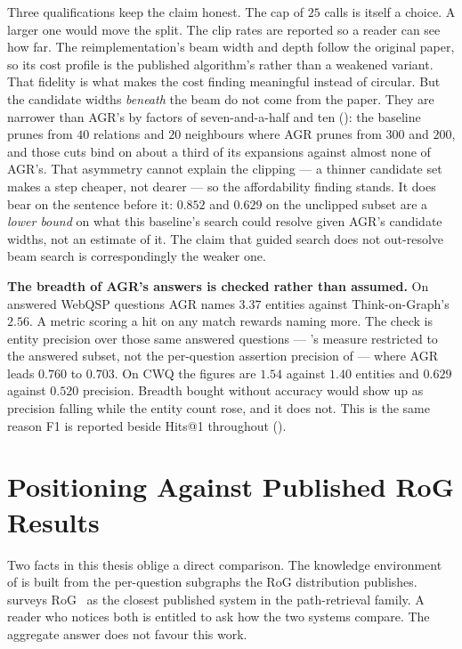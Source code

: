 Three qualifications keep the claim honest. The cap of $25$ calls is itself a
choice. A larger one would move the split. The clip rates are reported so a
reader can see how far. The reimplementation's beam width and depth follow the
original paper, so its cost profile is the published algorithm's rather than a
weakened variant. That fidelity is what makes the cost finding meaningful
instead of circular. But the candidate widths \emph{beneath} the beam do not
come from the paper. They are narrower than AGR's by factors of
seven-and-a-half and ten (): the baseline prunes from
$40$ relations and $20$ neighbours where AGR prunes from $300$ and $200$, and
those cuts bind on about a third of its expansions against almost none of
AGR's. That asymmetry cannot explain the clipping --- a thinner candidate set
makes a step cheaper, not dearer --- so the affordability finding stands. It
does bear on the sentence before it: $0.852$ and $0.629$ on the unclipped
subset are a \emph{lower bound} on what this baseline's search could resolve
given AGR's candidate widths, not an estimate of it. The claim that guided
search does not out-resolve beam search is correspondingly the weaker one.

\textbf{The breadth of AGR's answers is checked rather than assumed.} On
answered WebQSP questions AGR names $3.37$ entities against Think-on-Graph's
$2.56$. A metric scoring a hit on any match rewards naming more. The check
is entity precision over those same answered questions --- 's
measure restricted to the answered subset, not the per-question assertion
precision of  --- where AGR leads $0.760$ to $0.703$. On
CWQ the figures are $1.54$ against $1.40$ entities and $0.629$ against $0.520$
precision. Breadth bought without accuracy would show up as precision falling
while the entity count rose, and it does not. This is the same reason F1 is
reported beside Hits@1 throughout ().

\section{Positioning Against Published RoG
Results}\label{sec:rog-comparison}

Two facts in this thesis oblige a direct comparison. The knowledge
environment of  is built from the per-question
subgraphs the RoG distribution publishes. 
surveys RoG~\cite{luo2024reasoning} as the closest published system in the
path-retrieval family. A reader who notices both is entitled to ask how the
two systems compare. The aggregate answer does not favour this work.


